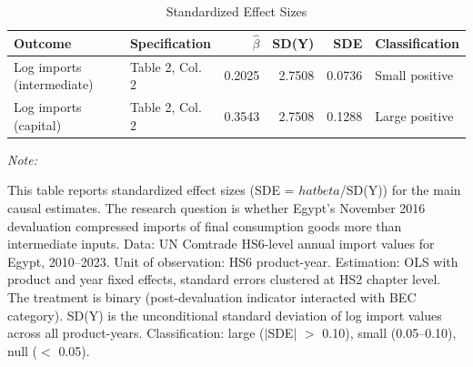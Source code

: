 \begin{table}[!h]
\centering
\caption{\label{tab:tab:sde}Standardized Effect Sizes}
\centering
\begin{threeparttable}
\begin{tabular}[t]{llrrrl}
\toprule
Outcome & Specification & $\hat{\beta}$ & SD(Y) & SDE & Classification\\
\midrule
Log imports (intermediate) & Table 2, Col. 2 & 0.2025 & 2.7508 & 0.0736 & Small positive\\
Log imports (capital) & Table 2, Col. 2 & 0.3543 & 2.7508 & 0.1288 & Large positive\\
\bottomrule
\end{tabular}
\begin{tablenotes}
\item \textit{Note: } 
\item This table reports standardized effect sizes (SDE = $hat{beta}$/SD(Y)) for the main causal estimates. The research question is whether Egypt's November 2016 devaluation compressed imports of final consumption goods more than intermediate inputs. Data: UN Comtrade HS6-level annual import values for Egypt, 2010--2023. Unit of observation: HS6 product-year. Estimation: OLS with product and year fixed effects, standard errors clustered at HS2 chapter level. The treatment is binary (post-devaluation indicator interacted with BEC category). SD(Y) is the unconditional standard deviation of log import values across all product-years. Classification: large ($|$SDE$|$ $>$ 0.10), small (0.05--0.10), null ($<$ 0.05).
\end{tablenotes}
\end{threeparttable}
\end{table}
